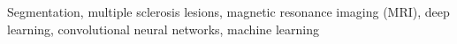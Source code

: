 \begin{abstract}

\end{abstract}

\begin{IEEEkeywords}
Segmentation, multiple sclerosis lesions, magnetic resonance imaging (MRI), deep
learning, convolutional neural networks, machine learning 
\end{IEEEkeywords}
